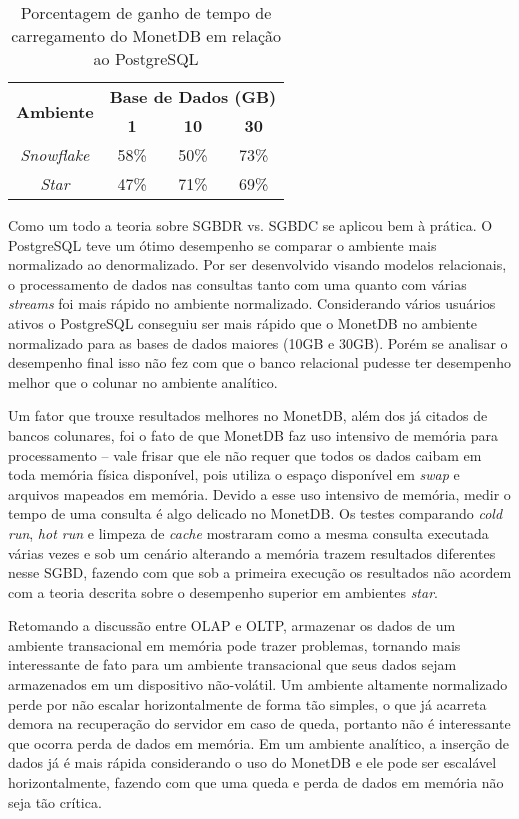 \begin{table}[htpb]
    \centering
    \caption{Porcentagem de ganho de tempo de carregamento do MonetDB em relação ao PostgreSQL}
    \label{tab:ganho_carregamento}
    \begin{tabular}{|c|c|c|c|}
    \hline
    \multirow{2}{*}{\textbf{Ambiente}} & \multicolumn{3}{c|}{\textbf{Base de Dados (GB)}} \\ \cline{2-4} 
                                       & \textbf{1}     & \textbf{10}    & \textbf{30}    \\ \hline
    \textit{Snowflake}                 & 58\%           & 50\%           & 73\%           \\ \hline
    \textit{Star}                      & 47\%           & 71\%           & 69\%           \\ \hline
    \end{tabular}
    \end{table}
    
Como um todo a teoria sobre SGBDR vs. SGBDC se aplicou bem à prática. O PostgreSQL teve um ótimo desempenho se comparar o ambiente mais normalizado ao denormalizado. Por ser desenvolvido visando modelos relacionais, o processamento de dados nas consultas tanto com uma quanto com várias \textit{streams} foi mais rápido no ambiente normalizado. Considerando vários usuários ativos o PostgreSQL conseguiu ser mais rápido que o MonetDB no ambiente normalizado para as bases de dados maiores (10GB e 30GB). Porém se analisar o desempenho final isso não fez com que o banco relacional pudesse ter desempenho melhor que o colunar no ambiente analítico.

Um fator que trouxe resultados melhores no MonetDB, além dos já citados de bancos colunares, foi o fato de que MonetDB faz uso intensivo de memória para processamento -- vale frisar que ele não requer que todos os dados caibam em toda memória física disponível, pois utiliza o espaço disponível em \textit{swap} e arquivos mapeados em memória. Devido a esse uso intensivo de memória, medir o tempo de uma consulta é algo delicado no MonetDB. Os testes comparando \textit{cold run}, \textit{hot run} e limpeza de \textit{cache} mostraram como a mesma consulta executada várias vezes e sob um cenário alterando a memória trazem resultados diferentes nesse SGBD, fazendo com que sob a primeira execução os resultados não acordem com a teoria descrita sobre o desempenho superior em ambientes \textit{star}.

Retomando a discussão entre OLAP e OLTP, armazenar os dados de um ambiente transacional em memória pode trazer problemas, tornando mais interessante de fato para um ambiente transacional que seus dados sejam armazenados em um dispositivo não-volátil. Um ambiente altamente normalizado perde por não escalar horizontalmente de forma tão simples, o que já acarreta demora na recuperação do servidor em caso de queda, portanto não é interessante que ocorra perda de dados em memória. Em um ambiente analítico, a inserção de dados já é mais rápida considerando o uso do MonetDB e ele pode ser escalável horizontalmente, fazendo com que uma queda e perda de dados em memória não seja tão crítica.

